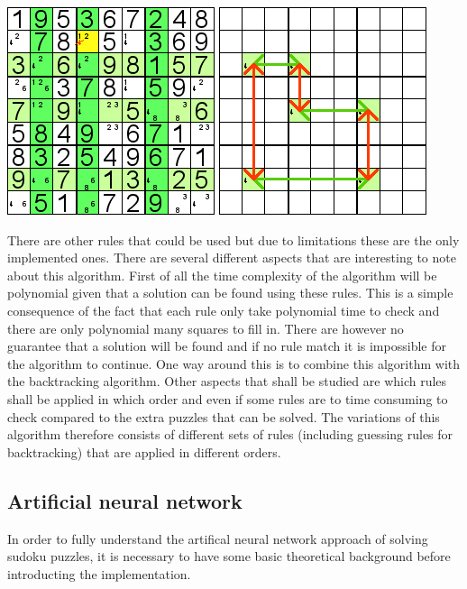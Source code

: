 \documentclass[a4paper,11pt]{kth-mag}
\begin{document}
\begin{description}
\includegraphics{images/swordfish1.png}
\newline
\includegraphics{images/swordfish2.png}

\end{description}

There are other rules that could be used but due to limitations these are the only implemented ones.
There are several different aspects that are interesting to note about this algorithm.
First of all the time complexity of the algorithm will be polynomial given that a solution can be found using these rules.
This is a simple consequence of the fact that each rule only take polynomial time to check and there are only polynomial many squares to fill in.
There are however no guarantee that a solution will be found and if no rule match it is impossible for the algorithm to continue.
One way around this is to combine this algorithm with the backtracking algorithm.
Other aspects that shall be studied are which rules shall be applied in which order and even if some rules are to time consuming to check compared to the extra puzzles that can be solved.
The variations of this algorithm therefore consists of different sets of rules (including guessing rules for backtracking) that are applied in different orders. 

\subsection{Artificial neural network}
In order to fully understand the artifical neural network approach of solving sudoku puzzles, it is necessary to have some basic theoretical background before introducting the implementation.
\end{document}
